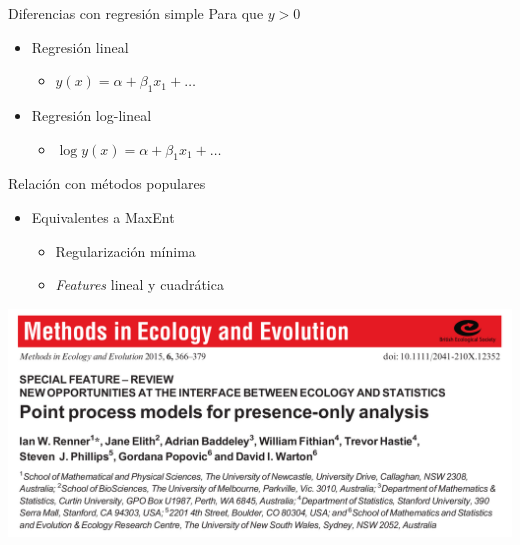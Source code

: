 \documentclass[
  11pt,
  ignorenonframetext,
]{beamer}
\providecommand{\tightlist}{%
  \setlength{\itemsep}{0pt}\setlength{\parskip}{0pt}}
\begin{document}
\begin{frame}{Diferencias con regresión simple}
\protect\hypertarget{diferencias-con-regresiuxf3n-simple-1}{}
Para que \(y >0\)

\begin{itemize}
\item
  Regresión lineal

  \begin{itemize}
  \tightlist
  \item
    \(y(x) = \alpha + \beta_1 x_1 + \dots\)
  \end{itemize}
\item
  Regresión log-lineal

  \begin{itemize}
  \tightlist
  \item
    \(\log y(x) = \alpha + \beta_1 x_1 + \dots\)
  \end{itemize}
\end{itemize}
\end{frame}

\begin{frame}{Relación con métodos populares}
\protect\hypertarget{relaciuxf3n-con-muxe9todos-populares}{}
\begin{itemize}
\item
  Equivalentes a MaxEnt

  \begin{itemize}
  \tightlist
  \item
    Regularización mínima
  \item
    \emph{Features} lineal y cuadrática
  \end{itemize}
\end{itemize}

\includegraphics{Figuras/Renner.png}
\end{frame}
\end{document}
